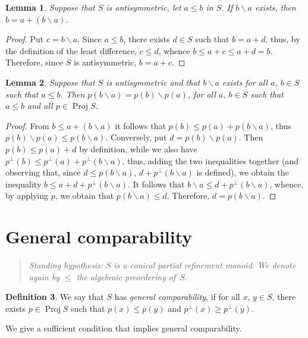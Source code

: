 \documentclass[psamsfonts,reqno]{memo-l}
\theoremstyle{plain}
\newtheorem{lemma}{Lemma}[section]
\theoremstyle{definition}
\newtheorem{definition}[lemma]{Definition}
\theoremstyle{remark}
\numberwithin{equation}{section}
\newcommand{\sd}{\smallsetminus}
\DeclareMathOperator{\BB}{Proj}
\newcommand{\prm}{partial refinement mon\-oid}
\begin{document}
\begin{lemma}\label{L:LstDiff}
Suppose that $S$ is antisymmetric, let $a\leq b$ in $S$. If $b\sd a$
exists, then $b=a+(b\sd a)$.
\end{lemma}

\begin{proof}
Put $c=b\sd a$.
Since $a\leq b$, there exists $d\in S$ such that $b=a+d$, thus, by the
definition of the least difference, $c\leq d$, whence $b\leq a+c\leq a+d=b$.
Therefore, since $S$ is antisymmetric, $b=a+c$.
\end{proof}

\begin{lemma}\label{L:SdProj}
Suppose that $S$ is antisymmetric and that $b\sd a$ exists for all $a$,
$b\in S$ such that $a\leq b$. Then $p(b\sd a)=p(b)\sd p(a)$, for all $a$,
$b\in S$ such that $a\leq b$ and all\index{pzzroj@$\BB{S}$} $p\in\BB{S}$.
\end{lemma}

\begin{proof}
{}From $b\leq a+(b\sd a)$ it follows that $p(b)\leq p(a)+p(b\sd a)$, thus
$p(b)\sd p(a)\leq p(b\sd a)$. Conversely, put $d=p(b)\sd p(a)$. Then
$p(b)\leq p(a)+d$ by definition, while we also have
$p^\bot(b)\leq p^\bot(a)+p^\bot(b\sd a)$, thus, adding the two inequalities
together (and observing that, since $d\leq p(b\sd a)$, $d+p^\bot(b\sd a)$ is
defined), we obtain the inequality $b\leq a+d+p^\bot(b\sd a)$. It follows
that $b\sd a\leq d+p^\bot(b\sd a)$, whence, by applying $p$, we obtain that
$p(b\sd a)\leq d$. Therefore, $d=p(b\sd a)$.
\end{proof}


\section{General comparability}\label{S:GenComp}

\begin{quote}
\em Standing hypothesis: $S$ is a conical \prm. We denote again by $\leq$ the
algebraic preordering of~$S$.
\end{quote}

\begin{definition}\label{D:GenCompMon}
We say that $S$ has \emph{general comparability},
 if for all $x$, $y\in S$,
there exists $p\in\BB{S}$\index{pzzroj@$\BB{S}$} such that $p(x)\leq p(y)$
and $p^\bot(x)\geq p^\bot(y)$.
\end{definition}

We give a sufficient condition that implies general comparability.
\end{document}
